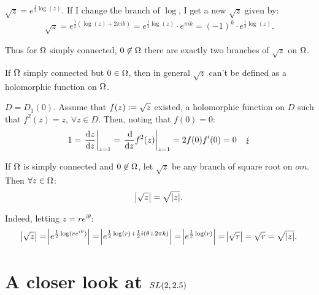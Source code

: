  
 \begin{example}
 $\sqrt{z} = e^ { \frac{1}{2}\log(z)}$. If I change the branch of $\log$, I get a new $\sqrt{z}$ given by: 
 \begin{align*}
 \sqrt{z} = e^{ \frac{1}{2} (\log(z)  + 2 \pi i k)} =  e^{\frac{1}{2} \log(z)} \cdot e^{\pi i k} = (-1)^k \cdot e^{\frac{1}{2} \log(z)}.
 \end{align*}
 
 Thus for $\Omega$ simply connected, $0 \not\in \Omega$ there are exactly two branches of $\sqrt{z}$ on $\Omega$.
 \end{example}
 
 \begin{remark}
 If $\Omega$ simply connected but $0 \in \Omega$, then in general $\sqrt{z}$ can't be defined as a holomorphic function on $\Omega$.
 \end{remark}
 
 \begin{counterexample}
 $D=D_1(0)$. Assume that $f(z) \vcentcolon = \sqrt{z}$ existed, a holomorphic function on $D$ such that $f^2(z) = z$, $\forall z \in D$. Then, noting that $f(0) = 0$:
 \begin{align*}
     1 = \left. \frac{\dif z }{\dif z}  \right|_{z=1} = \left. \frac{\dif }{\dif z} f^2(z)  \right|_{z=1} = 2 f(0) f'(0) = 0  \quad \lightning
 \end{align*}
 \end{counterexample}
 
 \begin{remark}
 If $\Omega$ is simply connected and $0 \not\in \Omega$, let $\sqrt{z}$ be any branch of square root on $
 om$. Then $\forall z \in \Omega$:
 \begin{align*}
     \abs{\sqrt{z}} = \sqrt{ \phantom{} \abs{z}}.
 \end{align*}
 
 Indeed, letting $z = re^{i \theta}$:
 \begin{align*}
     \abs{\sqrt{z}} = \abs{e^{\frac{1}{2} \log(re^{i \theta})}} = \abs{e^{\frac{1}{2} \log(r) + \frac{1}{2} i(\theta + 2 \pi k)}} =  \abs{e^{\frac{1}{2} \log(r)}} = \abs{\sqrt{r}} = \sqrt{r} = \sqrt{ \phantom{} \abs{z}}.
 \end{align*}
 \end{remark}
 
\section{A closer look at $SL(2,2.5) $}
 
